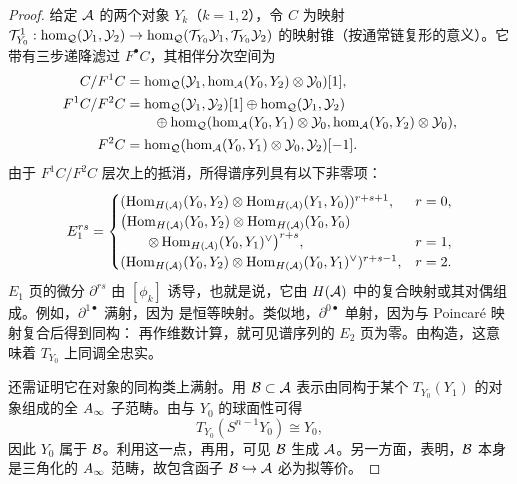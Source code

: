 \begin{proof}
给定 $\mathcal A$ 的两个对象 $Y_k$（$k=1,2$），令 $C$ 为映射 $\mathcal T_{Y_0}^1:\hom_{\mathcal Q}(\mathcal Y_1,\mathcal Y_2)\to\hom_{\mathcal Q}(\mathcal T_{Y_0}\mathcal Y_1,\mathcal T_{Y_0}\mathcal Y_2)$ 的映射锥（按通常链复形的意义）。它带有三步递降滤过 $F^{\bullet}C$，其相伴分次空间为
\[
\begin{aligned}
C/F^1C&=\hom_{\mathcal Q}(\mathcal Y_1,\hom_{\mathcal A}(Y_0,Y_2)\otimes\mathcal Y_0)[1],\\
F^1C/F^2C&=\hom_{\mathcal Q}(\mathcal Y_1,\mathcal Y_2)[1]\oplus\hom_{\mathcal Q}(\mathcal Y_1,\mathcal Y_2)\\[-2pt]
&\qquad\oplus\hom_{\mathcal Q}(\hom_{\mathcal A}(Y_0,Y_1)\otimes\mathcal Y_0,\hom_{\mathcal A}(Y_0,Y_2)\otimes\mathcal Y_0),\\
F^2C&=\hom_{\mathcal Q}(\hom_{\mathcal A}(Y_0,Y_1)\otimes\mathcal Y_0,\mathcal Y_2)[-1].
\end{aligned}
\]
由于 $F^1C/F^2C$ 层次上的抵消，所得谱序列具有以下非零项：
\[
E_1^{rs}=\begin{cases}
(\operatorname{Hom}_{H(\mathcal A)}(Y_0,Y_2)\otimes\operatorname{Hom}_{H(\mathcal A)}(Y_1,Y_0))^{r+s+1},&r=0,\\
\bigl(\operatorname{Hom}_{H(\mathcal A)}(Y_0,Y_2)\otimes\operatorname{Hom}_{H(\mathcal A)}(Y_0,Y_0)\\
\qquad\otimes\operatorname{Hom}_{H(\mathcal A)}(Y_0,Y_1)^{\vee}\bigr)^{r+s},&r=1,\\
(\operatorname{Hom}_{H(\mathcal A)}(Y_0,Y_2)\otimes\operatorname{Hom}_{H(\mathcal A)}(Y_0,Y_1)^{\vee})^{r+s-1},&r=2.
\end{cases}
\]
$E_1$ 页的微分 $\partial^{rs}$ 由 $[\phi_k]$ 诱导，也就是说，它由 $H(\mathcal A)$ 中的复合映射或其对偶组成。例如，$\partial^{1\bullet}$ 满射，因为
是恒等映射。类似地，$\partial^{0\bullet}$ 单射，因为与 Poincaré 映射复合后得到同构：
再作维数计算，就可见谱序列的 $E_2$ 页为零。由构造，这意味着 $T_{Y_0}$ 上同调全忠实。

还需证明它在对象的同构类上满射。用 $\mathcal B\subset\mathcal A$ 表示由同构于某个 $T_{Y_0}(Y_1)$ 的对象组成的全 $A_\infty$ 子范畴。由与 $Y_0$ 的球面性可得
\[
T_{Y_0}(S^{n-1}Y_0)\cong Y_0,
\]
因此 $Y_0$ 属于 $\mathcal B$。利用这一点，再用，可见 $\mathcal B$ 生成 $\mathcal A$。另一方面，表明，$\mathcal B$ 本身是三角化的 $A_\infty$ 范畴，故包含函子 $\mathcal B\hookrightarrow\mathcal A$ 必为拟等价。
\end{proof}

